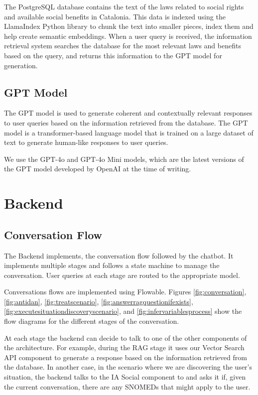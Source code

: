 \documentclass[a4paper,12pt,twoside]{ThesisStyle}
\begin{document}
The PostgreSQL database contains the text of the laws related to social rights and available social benefits in Catalonia. This data is indexed using the LlamaIndex Python library to chunk the text into smaller pieces, index them and  help create semantic embeddings. When a user query is received, the information retrieval system searches the database for the most relevant laws and benefits based on the query, and returns this information to the GPT model for generation.

\subsection{GPT Model}
\label{subsec:gpt_model}

The GPT model is used to generate coherent and contextually relevant responses to user queries based on the information retrieved from the database. The GPT model is a transformer-based \cite{Vaswani2023AttentionNeed} language model that is trained on a large dataset of text to generate human-like responses to user queries.

We use the GPT-4o and GPT-4o Mini models, which are the latest versions of the GPT model developed by OpenAI at the time of writing.

\section{Backend}
\label{sec:backend}

\subsection{Conversation Flow}
\label{subsec:conversation_flow}

The Backend implements, the conversation flow followed by the chatbot. It implements multiple stages and follows a state machine to manage the conversation. User queries at each stage are routed to the appropriate model.

Conversations flows are implemented using Flowable. Figures \ref{fig:conversation}, \ref{fig:antidan}, \ref{fig:treatscenario}, \ref{fig:answerragquestionifexists}, \ref{fig:executesituationdiscoveryscenario}, and \ref{fig:infervariablesprocess} show the flow diagrams for the different stages of the conversation.

At each stage the backend can decide to talk to one of the other components of the architecture. For example, during the RAG stage it uses our Vector Search API component to generate a response based on the information retrieved from the database. In another case, in the scenario where we are discovering the user's situation, the backend talks to the IA Social component to and asks it if, given the current conversation, there are any SNOMEDs that might apply to the user.
\end{document}

